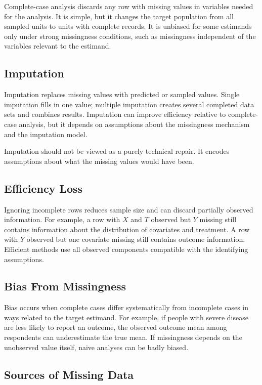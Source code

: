 Complete-case analysis discards any row with missing values in variables needed
for the analysis. It is simple, but it changes the target population from all
sampled units to units with complete records. It is unbiased for some estimands
only under strong missingness conditions, such as missingness independent of the
variables relevant to the estimand.

\subsection{Imputation}

Imputation replaces missing values with predicted or sampled values. Single
imputation fills in one value; multiple imputation creates several completed
data sets and combines results. Imputation can improve efficiency relative to
complete-case analysis, but it depends on assumptions about the missingness
mechanism and the imputation model.

Imputation should not be viewed as a purely technical repair. It encodes
assumptions about what the missing values would have been.

\subsection{Efficiency Loss}

Ignoring incomplete rows reduces sample size and can discard partially observed
information. For example, a row with $X$ and $T$ observed but $Y$ missing still
contains information about the distribution of covariates and treatment. A row
with $Y$ observed but one covariate missing still contains outcome information.
Efficient methods use all observed components compatible with the identifying
assumptions.

\subsection{Bias From Missingness}

Bias occurs when complete cases differ systematically from incomplete cases in
ways related to the target estimand. For example, if people with severe disease
are less likely to report an outcome, the observed outcome mean among
respondents can underestimate the true mean. If missingness depends on the
unobserved value itself, naive analyses can be badly biased.

\subsection{Sources of Missing Data}

